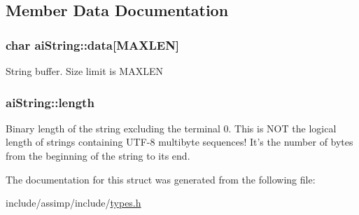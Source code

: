 \subsection{Member Data Documentation}
\hypertarget{structai_string_aa90b1da7d347a3dcca0a95061e6ea41d}{
\subsubsection[{data}]{\setlength{\rightskip}{0pt plus 5cm}char ai\-String\-::data\mbox{[}{\bf M\-A\-X\-L\-E\-N}\mbox{]}}}\label{structai_string_aa90b1da7d347a3dcca0a95061e6ea41d}
String buffer. Size limit is M\-A\-X\-L\-E\-N \hypertarget{structai_string_a7d77c2031ff0340746aa046f7fbcf313}{
\subsubsection[{length}]{ ai\-String\-::length}}\label{structai_string_a7d77c2031ff0340746aa046f7fbcf313}
Binary length of the string excluding the terminal 0. This is N\-O\-T the logical length of strings containing U\-T\-F-\/8 multibyte sequences! It's the number of bytes from the beginning of the string to its end. 

The documentation for this struct was generated from the following file\-:\begin{DoxyCompactItemize}
\item 
include/assimp/include/\hyperlink{types_8h}{types.\-h}\end{DoxyCompactItemize}
